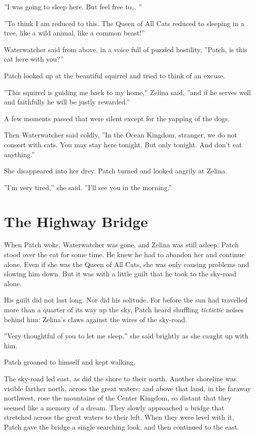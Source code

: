 \documentclass[12pt]{book}
\begin{document}
''I was going to sleep here. But feel free to\ldots{}
''

''To think I am reduced to this. The Queen of All Cats reduced to sleeping in a tree, like a wild animal, like a common beast!''

Waterwatcher said from above, in a voice full of puzzled hostility, ''Patch, is this cat here with you?''

Patch looked up at the beautiful squirrel and tried to think of an excuse.

''This squirrel is guiding me back to my home,'' Zelina said, ''and if he serves well and faithfully he will be justly rewarded.''

A few moments passed that were silent except for the yapping of the dogs.

Then Waterwatcher said coldly, ''In the Ocean Kingdom, stranger, we do not consort with cats. You may stay here tonight. But only tonight. And don't eat anything.''

She disappeared into her drey. Patch turned and looked angrily at Zelina.

''I'm very tired,'' she said. ''I'll see you in the morning.''


\section{The Highway Bridge}

When Patch woke, Waterwatcher was gone, and Zelina was still asleep. Patch stood over the cat for some time. He knew he had to abandon her and continue alone. Even if she was the Queen of All Cats, she was only causing problems and slowing him down. But it was with a little guilt that he took to the sky-road alone.

His guilt did not last long. Nor did his solitude. For before the sun had travelled more than a quarter of its way up the sky, Patch heard shuffling {\it tictictic} noises behind him: Zelina's claws against the wires of the sky-road.

''Very thoughtful of you to let me sleep,'' she said brightly as she caught up with him.

Patch groaned to himself and kept walking.

The sky-road led east, as did the shore to their north. Another shoreline was visible farther north, across the great waters; and above that land, in the faraway northwest, rose the mountains of the Center Kingdom, so distant that they seemed like a memory of a dream. They slowly approached a bridge that stretched across the great waters to their left. When they were level with it, Patch gave the bridge a single searching look, and then continued to the east.
\end{document}
